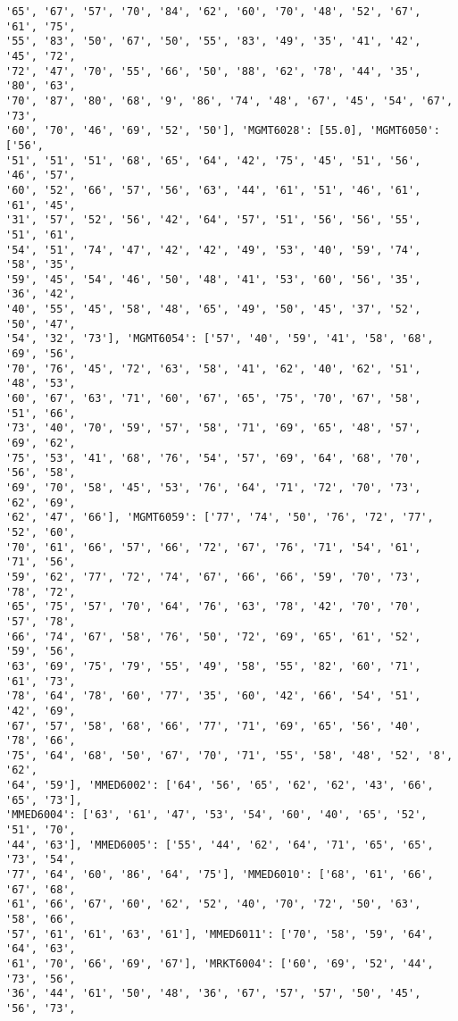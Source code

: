 \documentclass[11pt]{article}
\begin{document}
\begin{Verbatim}[commandchars=\\\{\}]
'65', '67', '57', '70', '84', '62', '60', '70', '48', '52', '67', '61', '75',
'55', '83', '50', '67', '50', '55', '83', '49', '35', '41', '42', '45', '72',
'72', '47', '70', '55', '66', '50', '88', '62', '78', '44', '35', '80', '63',
'70', '87', '80', '68', '9', '86', '74', '48', '67', '45', '54', '67', '73',
'60', '70', '46', '69', '52', '50'], 'MGMT6028': [55.0], 'MGMT6050': ['56',
'51', '51', '51', '68', '65', '64', '42', '75', '45', '51', '56', '46', '57',
'60', '52', '66', '57', '56', '63', '44', '61', '51', '46', '61', '61', '45',
'31', '57', '52', '56', '42', '64', '57', '51', '56', '56', '55', '51', '61',
'54', '51', '74', '47', '42', '42', '49', '53', '40', '59', '74', '58', '35',
'59', '45', '54', '46', '50', '48', '41', '53', '60', '56', '35', '36', '42',
'40', '55', '45', '58', '48', '65', '49', '50', '45', '37', '52', '50', '47',
'54', '32', '73'], 'MGMT6054': ['57', '40', '59', '41', '58', '68', '69', '56',
'70', '76', '45', '72', '63', '58', '41', '62', '40', '62', '51', '48', '53',
'60', '67', '63', '71', '60', '67', '65', '75', '70', '67', '58', '51', '66',
'73', '40', '70', '59', '57', '58', '71', '69', '65', '48', '57', '69', '62',
'75', '53', '41', '68', '76', '54', '57', '69', '64', '68', '70', '56', '58',
'69', '70', '58', '45', '53', '76', '64', '71', '72', '70', '73', '62', '69',
'62', '47', '66'], 'MGMT6059': ['77', '74', '50', '76', '72', '77', '52', '60',
'70', '61', '66', '57', '66', '72', '67', '76', '71', '54', '61', '71', '56',
'59', '62', '77', '72', '74', '67', '66', '66', '59', '70', '73', '78', '72',
'65', '75', '57', '70', '64', '76', '63', '78', '42', '70', '70', '57', '78',
'66', '74', '67', '58', '76', '50', '72', '69', '65', '61', '52', '59', '56',
'63', '69', '75', '79', '55', '49', '58', '55', '82', '60', '71', '61', '73',
'78', '64', '78', '60', '77', '35', '60', '42', '66', '54', '51', '42', '69',
'67', '57', '58', '68', '66', '77', '71', '69', '65', '56', '40', '78', '66',
'75', '64', '68', '50', '67', '70', '71', '55', '58', '48', '52', '8', '62',
'64', '59'], 'MMED6002': ['64', '56', '65', '62', '62', '43', '66', '65', '73'],
'MMED6004': ['63', '61', '47', '53', '54', '60', '40', '65', '52', '51', '70',
'44', '63'], 'MMED6005': ['55', '44', '62', '64', '71', '65', '65', '73', '54',
'77', '64', '60', '86', '64', '75'], 'MMED6010': ['68', '61', '66', '67', '68',
'61', '66', '67', '60', '62', '52', '40', '70', '72', '50', '63', '58', '66',
'57', '61', '61', '63', '61'], 'MMED6011': ['70', '58', '59', '64', '64', '63',
'61', '70', '66', '69', '67'], 'MRKT6004': ['60', '69', '52', '44', '73', '56',
'36', '44', '61', '50', '48', '36', '67', '57', '57', '50', '45', '56', '73',

\end{Verbatim}
\end{document}
